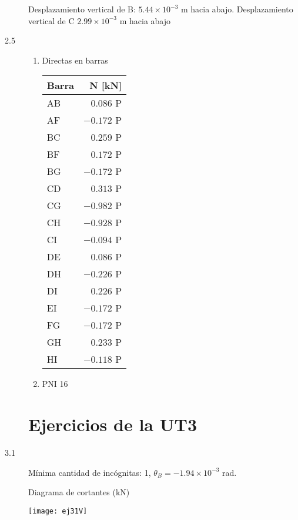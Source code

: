 \begin{description}
Desplazamiento vertical de B: $5.44 \times 10^{-3}$ m hacia abajo. Desplazamiento vertical de C $ 2.99 \times 10^{-3}$ m hacia abajo

\item[2.5]

\begin{enumerate}[label=\alph*)]
	\item
Directas en barras

\begin{center}
	\begin{tabular}{lr}
		\hline
		Barra & N [kN] \\
		\hline
AB & $0.086$ P \\
AF & $-0.172$ P \\
BC & $0.259$ P \\
BF & $0.172$ P \\
BG & $-0.172$ P \\
CD & $0.313$ P \\
CG & $-0.982$ P \\
CH & $-0.928$ P \\
CI & $-0.094$ P \\
DE & $0.086$ P \\
DH & $-0.226$ P \\
DI & $0.226$ P \\
EI & $-0.172$ P \\
FG & $-0.172$ P \\
GH & $0.233$ P \\
HI & $-0.118$ P \\
\hline
\end{tabular}
\end{center}

\item PNI 16
\end{enumerate}








\section{Ejercicios de la UT3}

\item[3.1] 
Mínima cantidad de incógnitas: 1, $\theta_B = -1.94 \times 10^{-3}$ rad.

Diagrama de cortantes (kN)

	\begin{center}
	\texttt{[image: ej31V]}
\end{center}


\end{description}
